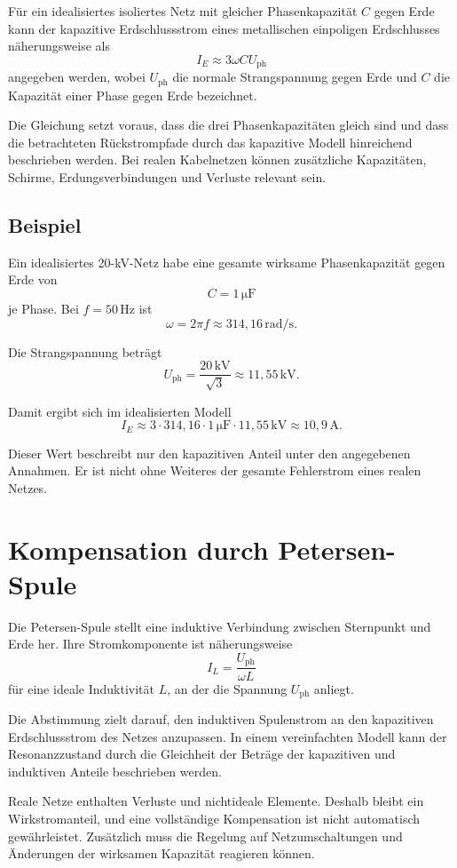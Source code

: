 Für ein idealisiertes isoliertes Netz mit gleicher Phasenkapazität \(C\)
gegen Erde kann der kapazitive Erdschlussstrom eines metallischen
einpoligen Erdschlusses näherungsweise als
\[
  I_E\approx3\omega C U_{\mathrm{ph}}
\]
angegeben werden, wobei \(U_{\mathrm{ph}}\) die normale Strangspannung
gegen Erde und \(C\) die Kapazität einer Phase gegen Erde bezeichnet.

Die Gleichung setzt voraus, dass die drei Phasenkapazitäten gleich sind
und dass die betrachteten Rückstrompfade durch das kapazitive Modell
hinreichend beschrieben werden. Bei realen Kabelnetzen können zusätzliche
Kapazitäten, Schirme, Erdungsverbindungen und Verluste relevant sein.

\subsection{Beispiel}

Ein idealisiertes 20-kV-Netz habe eine gesamte wirksame Phasenkapazität
gegen Erde von
\[
  C=1\,\mathrm{\mu F}
\]
je Phase. Bei \(f=50\,\mathrm{Hz}\) ist
\[
  \omega=2\pi f\approx314{,}16\,\mathrm{rad/s}.
\]

Die Strangspannung beträgt
\[
  U_{\mathrm{ph}}=\frac{20\,\mathrm{kV}}{\sqrt{3}}
  \approx11{,}55\,\mathrm{kV}.
\]

Damit ergibt sich im idealisierten Modell
\[
  I_E\approx3\cdot314{,}16\cdot1\,\mathrm{\mu F}
  \cdot11{,}55\,\mathrm{kV}
  \approx10{,}9\,\mathrm A.
\]

Dieser Wert beschreibt nur den kapazitiven Anteil unter den angegebenen
Annahmen. Er ist nicht ohne Weiteres der gesamte Fehlerstrom eines
realen Netzes.

\section{Kompensation durch Petersen-Spule}

Die Petersen-Spule stellt eine induktive Verbindung zwischen Sternpunkt
und Erde her. Ihre Stromkomponente ist näherungsweise
\[
  I_L=\frac{U_{\mathrm{ph}}}{\omega L}
\]
für eine ideale Induktivität \(L\), an der die Spannung \(U_{\mathrm{ph}}\)
anliegt.

Die Abstimmung zielt darauf, den induktiven Spulenstrom an den kapazitiven
Erdschlussstrom des Netzes anzupassen. In einem vereinfachten Modell
kann der Resonanzzustand durch die Gleichheit der Beträge der
kapazitiven und induktiven Anteile beschrieben werden.

Reale Netze enthalten Verluste und nichtideale Elemente. Deshalb bleibt
ein Wirkstromanteil, und eine vollständige Kompensation ist nicht
automatisch gewährleistet. Zusätzlich muss die Regelung auf
Netzumschaltungen und Änderungen der wirksamen Kapazität reagieren können.

